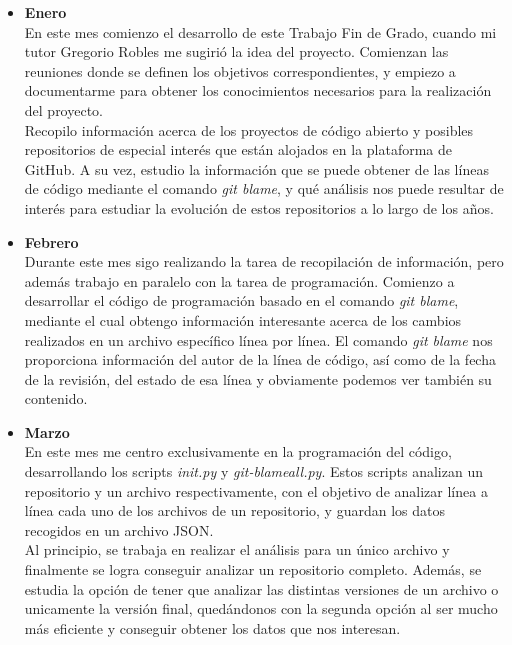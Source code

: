 \documentclass[a4paper, 12pt]{book}
\begin{document}
\begin{itemize}

  \item \textbf{Enero}
  \\En este mes comienzo el desarrollo de este Trabajo Fin de Grado, cuando mi tutor Gregorio Robles me sugirió la idea del proyecto.
  Comienzan las reuniones donde se definen los objetivos correspondientes, y empiezo a documentarme para obtener los conocimientos
  necesarios para la realización del proyecto.
  \\Recopilo información acerca de los proyectos de código abierto y posibles repositorios de especial interés que están alojados en la plataforma de GitHub.
  A su vez, estudio la información que se puede obtener de las líneas de código mediante el comando \textit{git blame}, y qué análisis nos puede
  resultar de interés para estudiar la evolución de estos repositorios a lo largo de los años.

  \item \textbf{Febrero}
  \\Durante este mes sigo realizando la tarea de recopilación de información, pero además trabajo en paralelo con la tarea de programación. Comienzo a 
  desarrollar el código de programación basado en el comando \textit{git blame}, mediante el cual obtengo información interesante acerca de
  los cambios realizados en un archivo específico línea por línea. El comando \textit{git blame} nos proporciona información del autor de la
  línea de código, así como de la fecha de la revisión, del estado de esa línea y obviamente podemos ver también su contenido.
  
  \item \textbf{Marzo}
  \\En este mes me centro exclusivamente en la programación del código, desarrollando los scripts \textit{init.py} y \textit{git-blameall.py}. Estos scripts
  analizan un repositorio y un archivo respectivamente, con el objetivo de analizar línea a línea cada uno de los archivos de un repositorio, y guardan los datos recogidos en un archivo JSON.
  \\Al principio, se trabaja en realizar el análisis para un único archivo y finalmente se logra conseguir analizar un repositorio completo. Además, se estudia
  la opción de tener que analizar las distintas versiones de un archivo o unicamente la versión final, quedándonos con la segunda opción al ser mucho más eficiente y 
  conseguir obtener los datos que nos interesan.
  

\end{itemize}
\end{document}
